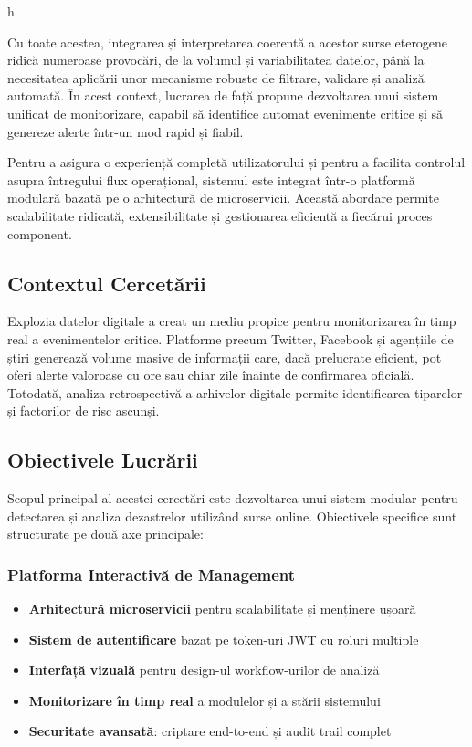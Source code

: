 h\documentclass[12pt,a4paper]{article}
\newcommand{\keyword}[1]{\textbf{#1}}
\begin{document}
Cu toate acestea, integrarea și interpretarea coerentă a acestor surse eterogene ridică numeroase provocări, de la volumul și variabilitatea datelor, până la necesitatea aplicării unor mecanisme robuste de filtrare, validare și analiză automată. În acest context, lucrarea de față propune dezvoltarea unui sistem unificat de monitorizare, capabil să identifice automat evenimente critice și să genereze alerte într-un mod rapid și fiabil. 

Pentru a asigura o experiență completă utilizatorului și pentru a facilita controlul asupra întregului flux operațional, sistemul este integrat într-o platformă modulară bazată pe o arhitectură de microservicii. Această abordare permite scalabilitate ridicată, extensibilitate și gestionarea eficientă a fiecărui proces component. 

\subsection{Contextul Cercetării}
\label{subsec:context}

\hspace{1em} Explozia datelor digitale a creat un mediu propice pentru monitorizarea în timp real a evenimentelor critice. Platforme precum Twitter, Facebook și agențiile de știri generează volume masive de informații care, dacă prelucrate eficient, pot oferi alerte valoroase cu ore sau chiar zile înainte de confirmarea oficială. Totodată, analiza retrospectivă a arhivelor digitale permite identificarea tiparelor și factorilor de risc ascunși.

\subsection{Obiectivele Lucrării}
\label{subsec:obiective}

\hspace{1em}Scopul principal al acestei cercetări este dezvoltarea unui sistem modular pentru detectarea și analiza dezastrelor utilizând surse online. Obiectivele specifice sunt structurate pe două axe principale:

\subsubsection{Platforma Interactivă de Management}
\label{subsubsec:platforma}

\begin{itemize}
    \item \keyword{Arhitectură microservicii} pentru scalabilitate și menținere ușoară
    \item \keyword{Sistem de autentificare} bazat pe token-uri JWT cu roluri multiple
    \item \keyword{Interfață vizuală} pentru design-ul workflow-urilor de analiză
    \item \keyword{Monitorizare în timp real} a modulelor și a stării sistemului
    \item \keyword{Securitate avansată}: criptare end-to-end și audit trail complet
\end{itemize}
\end{document}
